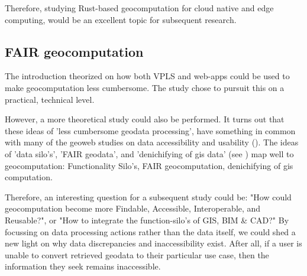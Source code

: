 Therefore, studying Rust-based geocomputation for cloud native and edge computing, would be an excellent topic for subsequent research. 

\subsection{FAIR geocomputation}
The introduction theorized on how both VPLS and web-apps could be used to make geocomputation less cumbersome.
The study chose to pursuit this on a practical, technical level. 

However, a more theoretical study could also be performed. 
It turns out that these ideas of 'less cumbersome geodata processing', have something in common with many of the geoweb studies on data accessibility and usability (\cite{brink_geospatial_2018}).
The ideas of 'data silo's', 'FAIR geodata', and 'denichifying of \ac{gis} data' (see \cite{brink_geospatial_2018}) map well to geocomputation:
Functionality Silo's, FAIR geocomputation, denichifying of \ac{gis} computation. 

Therefore, an interesting question for a subsequent study could be: "How could geocomputation become more Findable, Accessible, Interoperable, and Reusable?", or "How to integrate the function-silo's of GIS, BIM \& CAD?"
By focussing on data processing actions rather than the data itself, we could shed a new light on why data discrepancies and inaccessibility exist. 
After all, if a user is unable to convert retrieved geodata to their particular use case, then the information they seek remains inaccessible.







  

